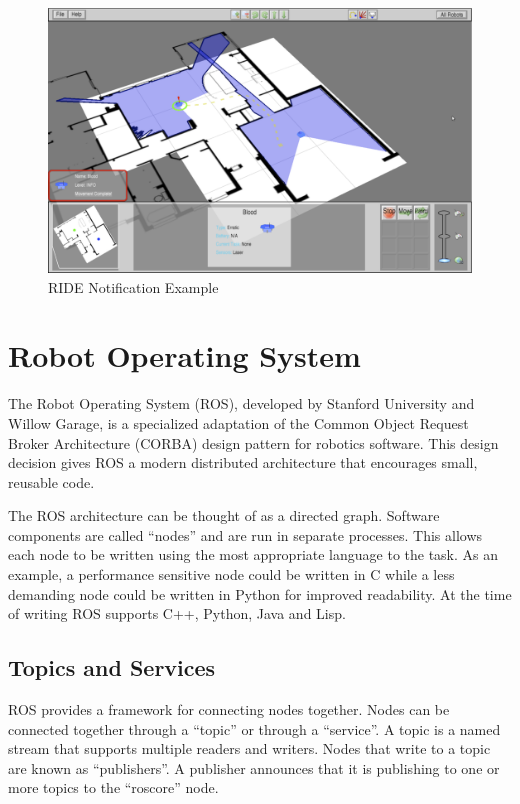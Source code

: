 \begin{figure}[ht]
\begin{center}
\includegraphics[width=6.10in]{images/ride-notification.png}
\caption{RIDE Notification Example\label{fig:ride-notification}}
\end{center}
\end{figure}


\section{Robot Operating System}
The Robot Operating System (ROS), developed by Stanford University and Willow Garage, is a specialized adaptation of the Common Object Request Broker Architecture (CORBA) design pattern for robotics software. This design decision gives ROS a modern distributed architecture that encourages small, reusable code.

The ROS architecture can be thought of as a directed graph. Software components are called ``nodes'' and are run in separate processes. This allows each node to be written using the most appropriate language to the task. As an example, a performance sensitive node could be written in C while a less demanding node could be written in Python for improved readability. At the time of writing ROS supports C++, Python, Java and Lisp.


\subsection{Topics and Services}
ROS provides a framework for connecting nodes together. Nodes can be connected together through a ``topic'' or through a ``service''. A topic is a named stream that supports multiple readers and writers. Nodes that write to a topic are known as ``publishers''. A publisher announces that it is publishing to one or more topics to the ``roscore'' node. 

